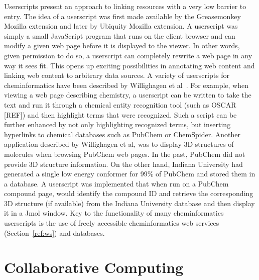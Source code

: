 \documentclass[11pt]{book}
\begin{document}
Userscripts present an approach to linking resources with a very low
barrier to entry. The idea of a userscript was first made available by
the Greasemonkey Mozilla extension and later by Ubiquity Mozilla
extension. A userscript was simply a small JavaScript program that
runs on the client browser and can modify a given web page before it
is displayed to the viewer. In other words, given permission to do so,
a userscript can completely rewrite a web page in any way it sees
fit. This opens up exciting possibilities in annotating web content
and linking web content to arbitrary data sources. A variety of
userscripts for cheminformatics have been described by Willighagen et
al~\cite{Willighagen2007b}. For example, when viewing a web page describing
chemistry, a userscript can be written to take the text and run it
through a chemical entity recognition tool (such as OSCAR [REF]) and
then highlight terms that were recognized. Such a script can be further
enhanced by not only highlighting recognized terms, but inserting
hyperlinks to chemical databases such as PubChem or
ChemSpider. Another application described by Willighagen et al, was to
display 3D structures of molecules when browsing PubChem web pages. In
the past, PubChem did not provide 3D structure information. On the
other hand, Indiana University had generated a single low energy
conformer for 99\% of PubChem and stored them in a database. A
userscript was implemented that when run on a PubChem compound page,
would identify the compound ID and retrieve the corresponding 3D
structure (if available) from the Indiana University database and then
display it in a Jmol window. Key to the functionality of many
cheminformatics userscripts is the use of freely accessible
cheminformatics web services (Section~\ref{ref:ws}) and databases.

\section{Collaborative Computing}
\end{document}
